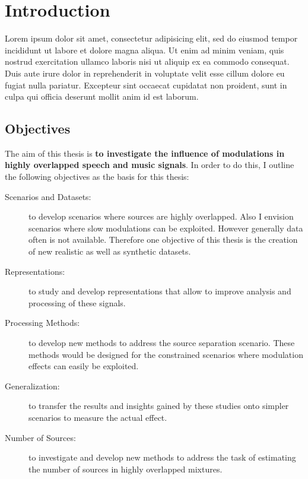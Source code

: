 \chapter{Introduction}\label{ch:introduction}

Lorem ipsum dolor sit amet, consectetur adipisicing elit, sed do eiusmod tempor incididunt ut labore et dolore magna aliqua. Ut enim ad minim veniam, quis nostrud exercitation ullamco laboris nisi ut aliquip ex ea commodo consequat. Duis aute irure dolor in reprehenderit in voluptate velit esse cillum dolore eu fugiat nulla pariatur. Excepteur sint occaecat cupidatat non proident, sunt in culpa qui officia deserunt mollit anim id est laborum.


\section{Objectives}

The aim of this thesis is \textbf{to investigate the influence of modulations in highly overlapped speech and music signals}.
In order to do this, I outline the following objectives as the basis for this thesis:

\begin{description}
  \item[Scenarios and Datasets:] to develop scenarios where sources are highly overlapped. Also I envision scenarios where slow modulations can be exploited. However generally data often is not available. Therefore one objective of this thesis is the creation of new realistic as well as synthetic datasets.
  \item[Representations:] 
    to study and develop representations that allow to improve analysis and processing of these signals.
  \item[Processing Methods:] to develop new methods to address the source separation scenario. These methods would be designed for the constrained scenarios where modulation effects can easily be exploited.
  \item[Generalization:] to transfer the results and insights gained by these
    studies onto simpler scenarios to measure the actual effect.
  \item[Number of Sources:] to investigate and develop new methods to address the task of estimating the number of sources in highly overlapped mixtures.
\end{description}


